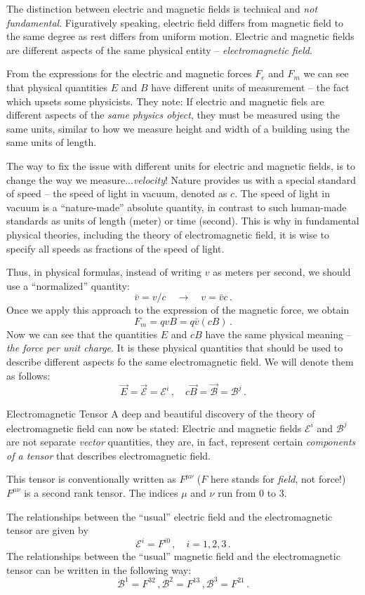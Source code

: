 The distinction between electric and magnetic fields is technical and
\emph{not fundamental}. Figuratively speaking, electric field differs
from magnetic field to the same degree as rest differs from uniform
motion. Electric and magnetic fields are different aspects of the same
physical entity -- \emph{electromagnetic field}.

From the expressions for the electric and magnetic forces $F_e$ and
$F_m$ we can see that physical quantities $E$ and $B$ have different
units of measurement -- the fact which upsets some physicists. They
note: If electric and magnetic fiels are different aspects of the
\emph{same physics object}, they must be measured using the same
units, similar to how we measure height and width of a building using
the same units of length.

The way to fix the issue with different units for electric and
magnetic fields, is to change the way we measure...\emph{velocity}! Nature
provides us with a special standard of speed -- the speed of light in
vacuum, denoted  as $c$. The speed of light in vacuum is a
``nature-made'' absolute quantity, in contrast to such human-made standards as units of
length (meter) or time (second). This is why in fundamental physical
theories,
including the theory of electromagnetic field, it is wise to specify
all speeds as fractions of the speed of light.

Thus, in physical formulas, instead of writing $v$ as meters per
second, we should use a ``normalized'' quantity:
\[
\bar{v} = v / c\quad\rightarrow\quad v = \bar{v}c\,.
\]
Once we apply this approach to the expression of the magnetic force,
we obtain
\[
F_m = qvB = q\bar{v}(cB)\,.
\]
Now we can see that the quantities $E$ and $cB$ have the same
physical meaning -- \emph{the force per unit charge}. It is these
physical quantities that should be used to describe different aspects
fo the same electromagnetic field. We will denote them as follows:
\[
\vec{E} = \vec{\mathcal{E}}=\mathcal{E}^i\,,\quad c\vec{B} =
\vec{\mathcal{B}}=\mathcal{B}^j\,.
\]

\begin{mybio}{Electromagnetic Tensor}
A deep and beautiful discovery of the theory of electromagnetic field
can now be stated: Electric and magnetic fields
$\mathcal{E}^i$ and $\mathcal{B}^j$ are not separate \emph{vector}
quantities, they are, in fact, represent certain
\emph{components of a tensor} that describes electromagnetic field.

This tensor is conventionally written as $F^{\mu\nu}$ ($F$ here stands
for \emph{field}, not force!) $F^{\mu\nu}$ is a second rank tensor.
The indices $\mu$ and $\nu$ run from $0$ to $3$.

The relationships between the ``usual'' electric field and the
electromagnetic tensor are given by
\[
\mathcal{E}^i = F^{i0}\,,\quad i=1,2,3\,.
\]
The relationships between the ``usual'' magnetic field and the
electromagnetic tensor can be written in the following way:
\[
\mathcal{B}^1 = F^{32}\,,\mathcal{B}^2 = F^{13}\,,\mathcal{B}^3 = F^{21}\,.
\]
\end{mybio}

